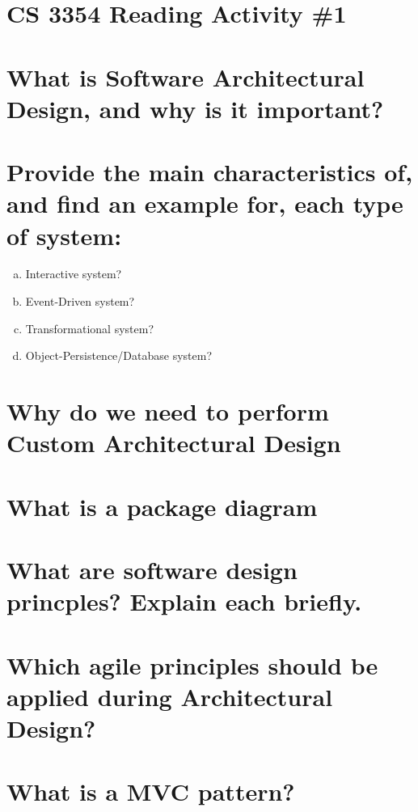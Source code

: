 
\section*{\Huge\bfseries CS 3354 Reading Activity \#1}

\section{What is Software Architectural Design, and why is it important?}
\section{Provide the main characteristics of, and find an example for, each type of system:}
\begin{enumerate}[a.]
	\item Interactive system?
	\item Event-Driven system?
	\item Transformational system?
	\item Object-Persistence/Database system?
\end{enumerate}
\section{Why do we need to perform Custom Architectural Design}
\section{What is a package diagram}
\section{What are software design princples? Explain each briefly.}
\section{Which agile principles should be applied during Architectural Design?}
\section{What is a MVC pattern?}
